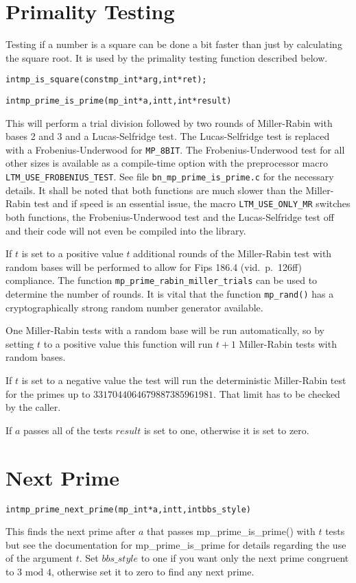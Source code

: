 \documentclass[synpaper]{book}
\begin{document}
\section{Primality Testing}
Testing if a number is a square can be done a bit faster than just by calculating the square root. It is used by the primality testing function described below.
\begin{alltt}
int mp_is_square(const mp_int *arg, int *ret);
\end{alltt}


\begin{alltt}
int mp_prime_is_prime (mp_int * a, int t, int *result)
\end{alltt}
This will perform a trial division followed by two rounds of Miller-Rabin with bases 2 and 3 and a Lucas-Selfridge test. The Lucas-Selfridge test is replaced with a Frobenius-Underwood for \texttt{MP\_8BIT}. The Frobenius-Underwood test for all other sizes is available as a compile-time option with the preprocessor macro \texttt{LTM\_USE\_FROBENIUS\_TEST}. See file
\texttt{bn\_mp\_prime\_is\_prime.c} for the necessary details. It shall be noted that both functions are much slower than
the Miller-Rabin test and if speed is an essential issue, the macro \texttt{LTM\_USE\_ONLY\_MR} switches both functions, the Frobenius-Underwood test and the Lucas-Selfridge test off and their code will not even be compiled into the library.

If $t$ is set to a positive value $t$ additional rounds of the Miller-Rabin test with random bases will be performed to allow for Fips 186.4 (vid.~p.~126ff) compliance. The function \texttt{mp\_prime\_rabin\_miller\_trials} can be used to determine the number of rounds. It is vital that the function \texttt{mp\_rand()} has a cryptographically strong random number generator available.

One Miller-Rabin tests with a random base will be run automatically, so by setting $t$ to a positive value this function will run $t + 1$ Miller-Rabin tests with random bases.

If  $t$ is set to a negative value the test will run the deterministic Miller-Rabin test for the primes up to $3317044064679887385961981$. That limit has to be checked by the caller.

If $a$ passes all of the tests $result$ is set to one, otherwise it is set to zero.

\section{Next Prime}
\begin{alltt}
int mp_prime_next_prime(mp_int *a, int t, int bbs_style)
\end{alltt}
This finds the next prime after $a$ that passes mp\_prime\_is\_prime() with $t$ tests but see the documentation for
mp\_prime\_is\_prime for details regarding the use of the argument $t$.  Set $bbs\_style$ to one if you
want only the next prime congruent to $3 \mbox{ mod } 4$, otherwise set it to zero to find any next prime.
\end{document}
